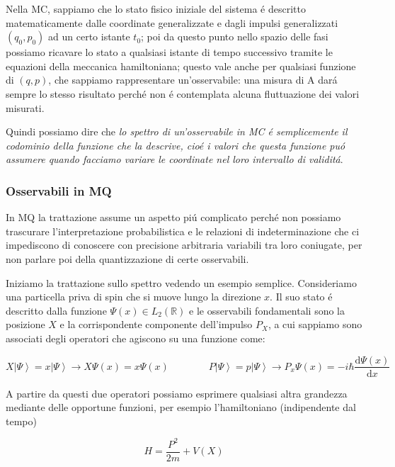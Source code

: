 Nella MC, sappiamo che lo stato fisico iniziale del sistema \'e descritto matematicamente dalle coordinate generalizzate e dagli impulsi generalizzati $(q_0, p_0)$ ad un certo istante $t_0$; poi da questo punto nello spazio delle fasi possiamo ricavare lo stato a qualsiasi istante di tempo successivo tramite le equazioni della meccanica hamiltoniana; questo vale anche per qualsiasi funzione di $(q, p)$, che sappiamo rappresentare un'osservabile: una misura di A dar\'a sempre lo stesso risultato perch\'e non \'e contemplata alcuna fluttuazione dei valori misurati.

Quindi possiamo dire che \textit{lo spettro di un'osservabile in MC \'e semplicemente il codominio della funzione che la descrive, cio\'e i valori che questa funzione pu\'o assumere quando facciamo variare le coordinate nel loro intervallo di validit\'a}.


\subsubsection{Osservabili in MQ}

In MQ la trattazione assume un aspetto pi\'u complicato perch\'e non possiamo trascurare l'interpretazione probabilistica e le relazioni di indeterminazione che ci impediscono di conoscere con precisione arbitraria variabili tra loro coniugate, per non parlare poi della quantizzazione di certe osservabili.

Iniziamo la trattazione sullo spettro vedendo un esempio semplice. Consideriamo una particella priva di spin che si muove lungo la direzione $x$. Il suo stato \'e descritto dalla funzione $\Psi(x) \in L_2(\mathbb{R})$ e le osservabili fondamentali sono la posizione $X$ e la corrispondente componente dell'impulso $P_X$, a cui sappiamo sono associati degli operatori che agiscono su una funzione come:

\begin{equation}
	X\left|\Psi\right\rangle=x\left|\Psi\right\rangle\longrightarrow X\Psi(x)=x\Psi(x)\qquad\qquad P\left|\Psi\right\rangle=p\left|\Psi\right\rangle\longrightarrow P_{x}\Psi(x)=-i\hbar\frac{\mathrm{d}\Psi(x)}{\mathrm{d}x}
\end{equation}

A partire da questi due operatori possiamo esprimere qualsiasi altra grandezza mediante delle opportune funzioni, per esempio l'hamiltoniano (indipendente dal tempo)

\begin{equation}
	H={\frac{P^{2}}{2m}}+V(X)
\end{equation}

